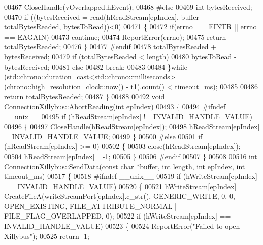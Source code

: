 \begin{DoxyCode}
00467         CloseHandle(vOverlapped.hEvent);
00468 \textcolor{preprocessor}{#else}
00469         \textcolor{keywordtype}{int} bytesReceived;
00470         \textcolor{keywordflow}{if} ((bytesReceived = read(hReadStream[epIndex], buffer+ totalBytesReaded, bytesToRead))<0)
00471         \{
00472             \textcolor{keywordflow}{if}(errno == EINTR || errno == EAGAIN)
00473                 \textcolor{keywordflow}{continue};
00474             ReportError(errno);
00475             \textcolor{keywordflow}{return} totalBytesReaded;
00476         \}
00477 \textcolor{preprocessor}{#endif}
00478         totalBytesReaded += bytesReceived;
00479         \textcolor{keywordflow}{if} (totalBytesReaded < length)
00480             bytesToRead -= bytesReceived;
00481         \textcolor{keywordflow}{else}
00482             \textcolor{keywordflow}{break};
00483 
00484     \}\textcolor{keywordflow}{while} (std::chrono::duration\_cast<std::chrono::milliseconds>(chrono::high\_resolution\_clock::now() - 
      t1).count() < timeout\_ms);
00485 
00486     \textcolor{keywordflow}{return} totalBytesReaded;
00487 \}
00488 
00492 \textcolor{keywordtype}{void} ConnectionXillybus::AbortReading(\textcolor{keywordtype}{int} epIndex)
00493 \{
00494 \textcolor{preprocessor}{#ifndef \_\_unix\_\_}
00495     \textcolor{keywordflow}{if} (hReadStream[epIndex] != INVALID\_HANDLE\_VALUE)
00496     \{
00497         CloseHandle(hReadStream[epIndex]);
00498     hReadStream[epIndex] = INVALID\_HANDLE\_VALUE;
00499     \}
00500 \textcolor{preprocessor}{#else}
00501     \textcolor{keywordflow}{if} (hReadStream[epIndex] >= 0)
00502     \{
00503         close(hReadStream[epIndex]);
00504         hReadStream[epIndex] =-1;
00505     \}
00506 \textcolor{preprocessor}{#endif}
00507 \}
00508 
00516 \textcolor{keywordtype}{int} ConnectionXillybus::SendData(\textcolor{keyword}{const} \textcolor{keywordtype}{char} *buffer, \textcolor{keywordtype}{int} length, \textcolor{keywordtype}{int} epIndex, \textcolor{keywordtype}{int} 
      timeout_ms)
00517 \{
00518 \textcolor{preprocessor}{#ifndef \_\_unix\_\_}
00519     \textcolor{keywordflow}{if} (hWriteStream[epIndex] == INVALID\_HANDLE\_VALUE)
00520     \{
00521         hWriteStream[epIndex] = CreateFileA(writeStreamPort[epIndex].c\_str(), GENERIC\_WRITE, 0, 0, 
      OPEN\_EXISTING, FILE\_ATTRIBUTE\_NORMAL | FILE\_FLAG\_OVERLAPPED, 0);
00522         \textcolor{keywordflow}{if} (hWriteStream[epIndex] == INVALID\_HANDLE\_VALUE)
00523         \{
00524             ReportError(\textcolor{stringliteral}{"Failed to open Xillybus"});
00525             \textcolor{keywordflow}{return} -1;

\end{DoxyCode}
